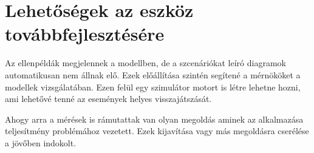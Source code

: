 \section{Lehetőségek az eszköz továbbfejlesztésére}

Az ellenpéldák megjelennek a modellben, de a szcenáriókat leíró diagramok automatikusan nem állnak elő. Ezek előállítása szintén segítené a mérnököket a modellek vizsgálatában. Ezen felül egy szimulátor motort is létre lehetne  hozni, ami lehetővé tenné az események helyes visszajátszását.

Ahogy arra a mérések is rámutattak van olyan megoldás aminek az alkalmazása teljesítmény problémához vezetett. Ezek kijavítása vagy más megoldásra cserélése a jövőben indokolt.


